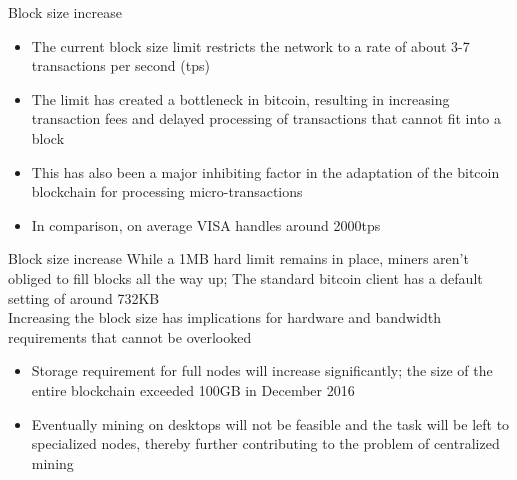\documentclass[9pt]{beamer}
\begin{document}

\begin{frame}{Block size increase}
	\begin{itemize}
		\item The current block size limit restricts the network to a rate of about 3-7 transactions per second (tps)
		\item The limit has created a bottleneck in bitcoin, resulting in increasing transaction fees and delayed processing of transactions that cannot fit into a block
		\item This has also been a major inhibiting factor in the adaptation of the bitcoin blockchain for processing micro-transactions
		\item In comparison, on average VISA handles around 2000tps
	\end{itemize}
\end{frame}



\begin{frame}{Block size increase}
	While a 1MB hard limit remains in place, miners aren't obliged to fill blocks all the way up; The standard bitcoin client has a default setting of around 732KB \\\vspace{3mm}
	Increasing the block size has implications for hardware and bandwidth requirements that cannot be overlooked
	\begin{itemize}
		\item Storage requirement for full nodes will increase significantly; the size of the entire blockchain exceeded 100GB in December 2016
		\item Eventually mining on desktops will not be feasible and the task will be left to specialized nodes, thereby further contributing to the problem of centralized mining
	\end{itemize}
\end{frame}

\end{document}
